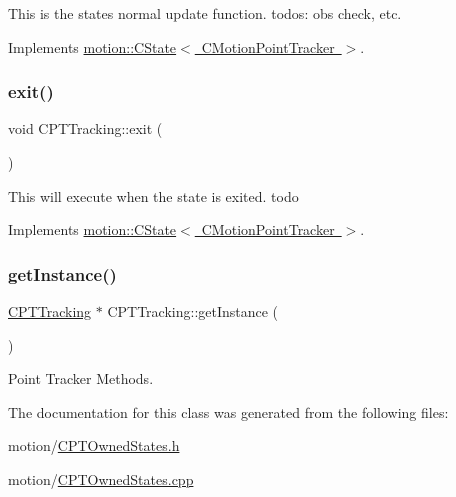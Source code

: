This is the states normal update function. todos\+: obs check, etc. 

Implements \mbox{\hyperlink{classmotion_1_1CState_a71dc72d345b15bf3b5b5bff596a71f33}{motion\+::\+C\+State$<$ C\+Motion\+Point\+Tracker $>$}}.

\mbox{\label{classmotion_1_1CPTTracking_aa7a6294200e0dd2c0d53f852558d7d89}} 
\subsubsection{\texorpdfstring{exit()}{exit()}}
{\footnotesize\ttfamily void C\+P\+T\+Tracking\+::exit (\begin{DoxyParamCaption}\item[{\mbox{\hyperlink{classmotion_1_1CMotionPointTracker}{C\+Motion\+Point\+Tracker}} $\ast$}]{ }\end{DoxyParamCaption})\hspace{0.3cm}{\ttfamily [virtual]}}

This will execute when the state is exited. todo 

Implements \mbox{\hyperlink{classmotion_1_1CState_a353db064c159d66b82bf257b35e7c016}{motion\+::\+C\+State$<$ C\+Motion\+Point\+Tracker $>$}}.

\mbox{\label{classmotion_1_1CPTTracking_a46a7c1bd0b68ce1c273ae32a75d76506}} 
\subsubsection{\texorpdfstring{get\+Instance()}{getInstance()}}
{\footnotesize\ttfamily \mbox{\hyperlink{classmotion_1_1CPTTracking}{C\+P\+T\+Tracking}} $\ast$ C\+P\+T\+Tracking\+::get\+Instance (\begin{DoxyParamCaption}\item[{void}]{ }\end{DoxyParamCaption})\hspace{0.3cm}{\ttfamily [static]}}

Point Tracker Methods. 

The documentation for this class was generated from the following files\+:\begin{DoxyCompactItemize}
\item 
motion/\mbox{\hyperlink{CPTOwnedStates_8h}{C\+P\+T\+Owned\+States.\+h}}\item 
motion/\mbox{\hyperlink{CPTOwnedStates_8cpp}{C\+P\+T\+Owned\+States.\+cpp}}\end{DoxyCompactItemize}

